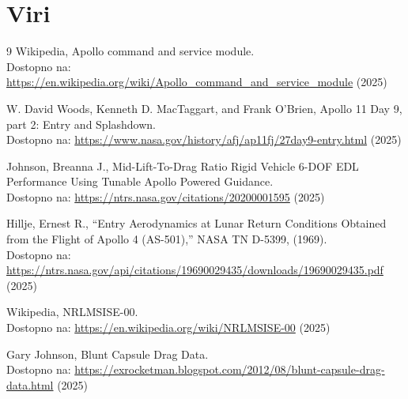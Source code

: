 \documentclass[a4paper,12pt]{article}
\begin{document}
    \pagebreak
    \section{Viri}
    \begin{thebibliography}{9}
        Wikipedia, Apollo command and service module. \\
        Dostopno na: \url{https://en.wikipedia.org/wiki/Apollo_command_and_service_module} (2025)
        \vspace{1cm}

        W. David Woods, Kenneth D. MacTaggart, and Frank O'Brien, Apollo 11 Day 9, part 2: Entry and Splashdown. \\
        Dostopno na: \url{https://www.nasa.gov/history/afj/ap11fj/27day9-entry.html} (2025)
        \vspace{1cm}

        Johnson, Breanna J., Mid-Lift-To-Drag Ratio Rigid Vehicle 6-DOF EDL Performance Using Tunable Apollo Powered Guidance. \\
        Dostopno na: \url{https://ntrs.nasa.gov/citations/20200001595} (2025)
        \vspace{1cm}

        Hillje, Ernest R., ``Entry Aerodynamics at Lunar Return Conditions Obtained from the Flight of Apollo 4 (AS-501),'' NASA TN D-5399, (1969). \\
        Dostopno na: \url{https://ntrs.nasa.gov/api/citations/19690029435/downloads/19690029435.pdf} (2025)
        \vspace{1cm}

        Wikipedia, NRLMSISE-00. \\
        Dostopno na: \url{https://en.wikipedia.org/wiki/NRLMSISE-00} (2025)

        Gary Johnson, Blunt Capsule Drag Data. \\
        Dostopno na: \url{https://exrocketman.blogspot.com/2012/08/blunt-capsule-drag-data.html} (2025)

    \end{thebibliography}
\end{document}
